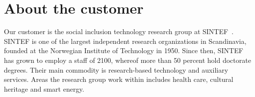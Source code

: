 \section{About the customer}

Our customer is the social inclusion technology research group at SINTEF~\cite{sintef}. SINTEF is one of the largest independent research organizations in Scandinavia, founded at the Norwegian Institute of Technology in 1950. Since then, SINTEF has grown to employ a staff of 2100, whereof more than 50 percent hold doctorate degrees. Their main commodity is research-based technology and auxiliary services. Areas the research group work within includes health care, cultural heritage and smart energy.

